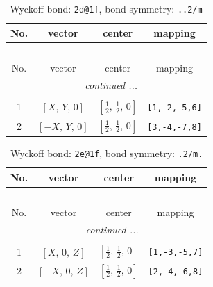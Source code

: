 \documentclass[fleqn,8pt]{jsarticle}
\begin{document}
\renewcommand{\arraystretch}{1.2}
\begin{longtable}{cccc}
\caption{Wyckoff bond: {\tt 2d@1f}, bond symmetry: {\tt ..2/m}}
 \\
 \hline \hline
No. & vector & center & mapping \\ \hline \endfirsthead

\multicolumn{3}{l}{\tablename\ \thetable{}} \\
 \hline \hline
No. & vector & center & mapping \\ \hline \endhead

 \hline \hline
\multicolumn{3}{r}{\footnotesize\it continued ...} \\ \endfoot

 \hline \hline
\multicolumn{3}{r}{} \\ \endlastfoot

1 & $\left[ X,\, Y,\, 0 \right]$ & $\left[ \frac{1}{2},\, \frac{1}{2},\, 0 \right]$ & {\tt [1,-2,-5,6]} \\ \hline
2 & $\left[ - X,\, Y,\, 0 \right]$ & $\left[ \frac{1}{2},\, \frac{1}{2},\, 0 \right]$ & {\tt [3,-4,-7,8]} \\
\end{longtable}
\renewcommand{\arraystretch}{1.2}
\begin{longtable}{cccc}
\caption{Wyckoff bond: {\tt 2e@1f}, bond symmetry: {\tt .2/m.}}
 \\
 \hline \hline
No. & vector & center & mapping \\ \hline \endfirsthead

\multicolumn{3}{l}{\tablename\ \thetable{}} \\
 \hline \hline
No. & vector & center & mapping \\ \hline \endhead

 \hline \hline
\multicolumn{3}{r}{\footnotesize\it continued ...} \\ \endfoot

 \hline \hline
\multicolumn{3}{r}{} \\ \endlastfoot

1 & $\left[ X,\, 0,\, Z \right]$ & $\left[ \frac{1}{2},\, \frac{1}{2},\, 0 \right]$ & {\tt [1,-3,-5,7]} \\ \hline
2 & $\left[ - X,\, 0,\, Z \right]$ & $\left[ \frac{1}{2},\, \frac{1}{2},\, 0 \right]$ & {\tt [2,-4,-6,8]} \\
\end{longtable}
\renewcommand{\arraystretch}{1.2}
\end{document}
